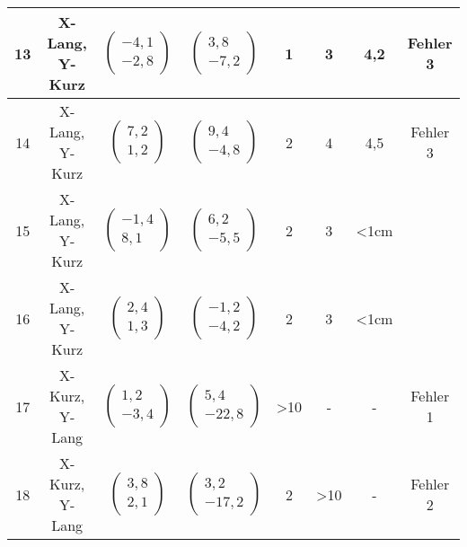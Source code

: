 \begin{center}
\begin{longtable}{|c|c|c|c|c|c|c|c|}
		\hline
		13 & X-Lang, Y-Kurz &  $\left(\begin{array}{c} -4,1 \\ -2,8\end{array}\right)$ & $\left(\begin{array}{c} 3,8 \\ -7,2\end{array}\right)$ & 1& 3& 4,2& Fehler 3\\
		\hline
		14 & X-Lang, Y-Kurz &  $\left(\begin{array}{c} 7,2 \\ 1,2\end{array}\right)$ & $\left(\begin{array}{c} 9,4 \\ -4,8\end{array}\right)$ & 2& 4& 4,5& Fehler 3\\
		\hline
		15 & X-Lang, Y-Kurz &  $\left(\begin{array}{c} -1,4 \\ 8,1\end{array}\right)$ & $\left(\begin{array}{c} 6,2 \\ -5,5\end{array}\right)$ & 2& 3& <1cm& \checkmark\\
		\hline
		16 & X-Lang, Y-Kurz &  $\left(\begin{array}{c} 2,4 \\ 1,3\end{array}\right)$ & $\left(\begin{array}{c} -1,2 \\ -4,2\end{array}\right)$ & 2& 3& <1cm& \checkmark\\
		\hline
		17 & X-Kurz, Y-Lang &  $\left(\begin{array}{c} 1,2 \\ -3,4\end{array}\right)$ & $\left(\begin{array}{c} 5,4 \\ -22,8\end{array}\right)$ & >10& -&- & Fehler 1\\
		\hline
		18 & X-Kurz, Y-Lang &  $\left(\begin{array}{c} 3,8 \\ 2,1\end{array}\right)$ & $\left(\begin{array}{c} 3,2 \\ -17,2\end{array}\right)$ & 2& >10& -& Fehler 2\\

\end{longtable}
\end{center}
